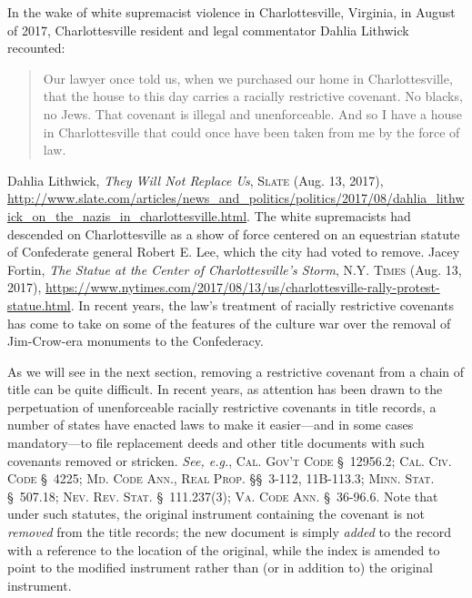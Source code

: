 In the wake of white supremacist violence in Charlottesville, Virginia, in
August of 2017, Charlottesville resident and legal commentator Dahlia Lithwick
recounted: 
\begin{quote}
Our lawyer once told us, when we purchased our home in Charlottesville, that
the house to this day carries a racially restrictive covenant. No blacks, no
Jews. That covenant is illegal and unenforceable. And so I have a house in
Charlottesville that could once have been taken from me by the force of law.
\end{quote}
Dahlia Lithwick, \textit{They Will Not Replace Us}, \textsc{Slate} (Aug. 13,
2017),
\url{http://www.slate.com/articles/news_and_politics/politics/2017/08/dahlia_lithwick_on_the_nazis_in_charlottesville.html}.
The white supremacists had descended on Charlottesville as a show of force
centered on an equestrian statute of Confederate general Robert E. Lee, which
the city had voted to remove. Jacey Fortin, \textit{The Statue at the Center of
Charlottesville's Storm}, \textsc{N.Y. Times} (Aug. 13, 2017),
\url{https://www.nytimes.com/2017/08/13/us/charlottesville-rally-protest-statue.html}.
In recent years, the law's treatment of racially restrictive covenants has come
to take on some of the features of the culture war over the removal of
Jim-Crow-era monuments to the Confederacy.

As we will see in the next section, removing a restrictive covenant from a chain
of title can be quite difficult. In recent years, as attention has been drawn to
the perpetuation of unenforceable racially restrictive covenants in title
records, a number of states have enacted laws to make it easier---and in some
cases mandatory---to file replacement deeds and other title documents with such
covenants removed or stricken. \textit{See, e.g.}, \textsc{Cal. Gov't Code}
\S~12956.2;
\textsc{Cal. Civ. Code} \S~4225; \textsc{Md. Code Ann., Real Prop.} \S\S~3-112,
11B-113.3; \textsc{Minn.
Stat.} \S~507.18; \textsc{Nev. Rev. Stat.} \S~111.237(3); \textsc{Va. Code Ann.}
\S~36-96.6.
Note that under such statutes, the original instrument containing the covenant
is not \textit{removed} from the title records; the new document is simply
\textit{added} to the record with a reference to the location of the original,
while the index is amended to point to the modified instrument rather than (or
in addition to) the original instrument.

